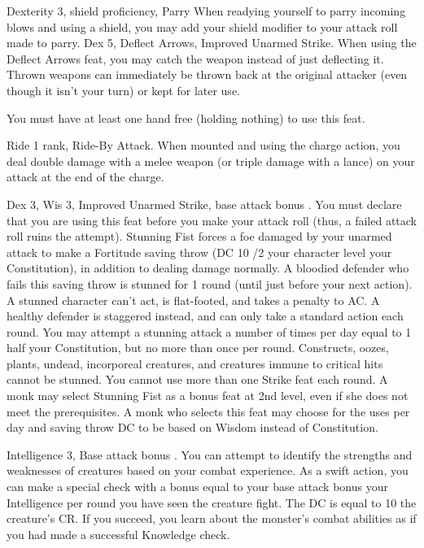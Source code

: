\featpres Dexterity 3, shield proficiency, Parry
\featben When readying yourself to parry incoming blows and using a shield, you may add your shield modifier to your attack roll made to parry.
 Dex 5, Deflect Arrows, Improved Unarmed Strike.
 When using the Deflect Arrows feat, you may catch the weapon instead of just deflecting it. Thrown weapons can immediately be thrown back at the original attacker (even though it isn't your turn) or kept for later use.
\par You must have at least one hand free (holding nothing) to use this feat.%

 Ride 1 rank, Ride-By Attack.
 When mounted and using the charge action, you deal double damage with a melee weapon (or triple damage with a lance) on your attack at the end of the charge.%

 Dex 3, Wis 3, Improved Unarmed Strike, base attack bonus .
 You must declare that you are using this feat before you make your attack roll (thus, a failed attack roll ruins the attempt). Stunning Fist forces a foe damaged by your unarmed attack to make a Fortitude saving throw (DC 10 /2 your character level \add your Constitution), in addition to dealing damage normally. A bloodied defender who fails this saving throw is stunned for 1 round (until just before your next action). A stunned character can't act, is flat-footed, and takes a  penalty to AC. A healthy defender is staggered instead, and can only take a standard action each round. You may attempt a stunning attack a number of times per day equal to 1 \add half your Constitution, but no more than once per round. Constructs, oozes, plants, undead, incorporeal creatures, and creatures immune to critical hits cannot be stunned. You cannot use more than one Strike feat each round.
 A monk may select Stunning Fist as a bonus feat at 2nd level, even if she does not meet the prerequisites. A monk who selects this feat may choose for the uses per day and saving throw DC to be based on Wisdom instead of Constitution.

 Intelligence 3, Base attack bonus .
 You can attempt to identify the strengths and weaknesses of creatures based on your combat experience. As a swift action, you can make a special check with a bonus equal to your base attack bonus \add your Intelligence  per round you have seen the creature fight. The DC is equal to 10 \add the creature's CR. If you succeed, you learn about the monster's combat abilities as if you had made a successful Knowledge check.

